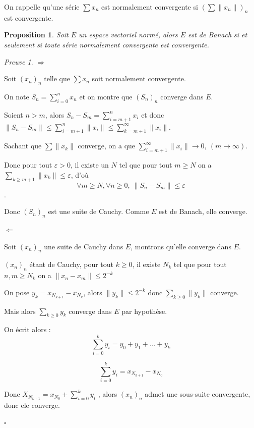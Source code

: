 \documentclass[]{article}
\newtheorem{myproposition}{Proposition}
\theoremstyle{remark}
\newtheorem{myproof}{Preuve}
\theoremstyle{definition}
\newcommand{\cqfd}{
	\hfill$\square$
}
\newenvironment{proofpart}[1]{
	\leavevmode
	
	\noindent
	{\textit{\textbf{\boldmath #1}}}
	
}{
	\checkmark
}
\begin{document}
On rappelle qu'une série $\sum x_n$ est normalement convergente si $\left(\sum \|x_n\|\right)_n$ est convergente.

\begin{myproposition}
	Soit $E$ un espace vectoriel normé, alors $E$ est de Banach si et seulement si toute série normalement convergente est convergente.
\end{myproposition}

\begin{myproof}
	\begin{proofpart}{$\Longrightarrow$}
	Soit $(x_n)_n$ telle que $\sum x_n$ soit normalement convergente.
	
	On note $\displaystyle S_n = \sum_{i = 0}^{n} x_n$ et on montre que $(S_n)_n$ converge dans $E$.
	
	Soient $n > m$, alors $\displaystyle S_n - S_m = \sum_{i = m + 1}^{n} x_i$ et donc $\displaystyle \|S_n - S_m\| \leqslant \sum_{i = m+1}^{n} \|x_i\| \leqslant \sum_{k = m + 1}^{\infty}\|x_i\|$.
	
	Sachant que $\sum \|x_k\|$ converge, on a que $\displaystyle \sum_{i = m + 1}^{\infty} \|x_i\| \longrightarrow 0, ~ (m \rightarrow \infty)$.
	
	Donc pour tout $\varepsilon > 0$, il existe un $N$ tel que pour tout $m \geqslant N$ on a $\displaystyle \sum_{k \geqslant m+1} \|x_k\| \leqslant \varepsilon$, d'où $$\forall m \geqslant N, \forall n \geqslant 0, ~ \|S_n - S_m\| \leqslant \varepsilon$$.
	
	Donc $(S_n)_n$ est une suite de Cauchy. Comme $E$ est de Banach, elle converge.
	\end{proofpart}
	
	\begin{proofpart}{$\Longleftarrow$}
		Soit $(x_n)_n$ une suite de Cauchy dans $E$, montrons qu'elle converge dans $E$.
		
		$(x_n)_n$ étant de Cauchy, pour tout $k \geqslant 0$, il existe $N_k$ tel que pour tout$n, m \geqslant N_k$ on a $\|x_n - x_m\| \leqslant 2^{-k}$
		
		On pose $y_k = x_{N_{k+1}} - x_{N_k}$, alors $\|y_k\| \leqslant 2^{-k}$ donc $\displaystyle \sum_{k \geqslant 0} \|y_k\|$ converge.
		
		Mais alors $\sum_{k \geqslant 0} y_k$ converge dans $E$ par hypothèse.
		
		On écrit alors : $$\sum_{i = 0}^{k} y_i = y_0 + y_1 + ... + y_k$$
		
		$$\sum_{i = 0}^{k} y_i = x_{N_{k+1}} - x_{N_0}$$
		
		Donc $\displaystyle X_{N_{k+1}} = x_{N_0} + \sum_{i=0}^k y_i$ , alors $(x_n)_n$ admet une sous-suite convergente, donc ele converge.
	\end{proofpart}

	\cqfd
\end{myproof}
\end{document}
